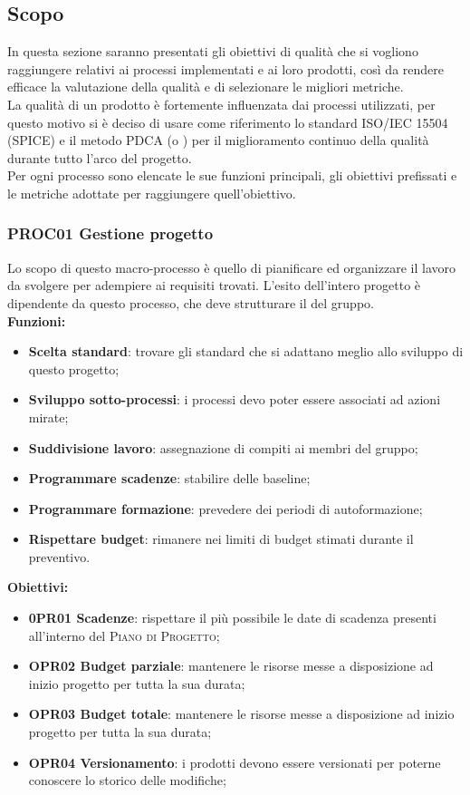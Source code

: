 \documentclass[../piano_di_qualifica.tex]{subfiles}
\begin{document}
\subsection{Scopo}
In questa sezione saranno presentati gli obiettivi di qualità che si vogliono raggiungere relativi ai processi implementati e ai loro prodotti, così da rendere efficace la valutazione della qualità e di selezionare le migliori metriche.\\
La qualità di un prodotto è fortemente influenzata dai processi utilizzati, per questo motivo si è deciso di usare come riferimento lo standard ISO/IEC 15504 (SPICE)  e il metodo PDCA (o ) per il miglioramento continuo della qualità durante tutto l'arco del progetto.\\
Per ogni processo sono elencate le sue funzioni principali, gli obiettivi prefissati e le metriche adottate per raggiungere quell’obiettivo.

\subsubsection{PROC01 Gestione progetto}
Lo scopo di questo macro-processo è quello di pianificare ed organizzare il lavoro da svolgere per adempiere ai requisiti trovati. L'esito dell'intero progetto è dipendente da questo processo, che deve strutturare il  del gruppo.\\

\setlength{\parindent}{0pt}\textbf{Funzioni:}
\smallbreak
\begin{itemize}
	\item \textbf{Scelta standard}: trovare gli standard che si adattano meglio allo sviluppo di questo progetto;
	\item \textbf{Sviluppo sotto-processi}: i processi devo poter essere associati ad azioni mirate;
	\item \textbf{Suddivisione lavoro}: assegnazione di compiti ai membri del gruppo;
	\item \textbf{Programmare scadenze}: stabilire delle baseline;
	\item \textbf{Programmare formazione}: prevedere dei periodi di autoformazione;
	\item \textbf{Rispettare budget}: rimanere nei limiti di budget stimati durante il preventivo.
\end{itemize}

\textbf{Obiettivi:}
\smallbreak
\begin{itemize}
	\item \textbf{0PR01 Scadenze}: rispettare il più possibile le date di scadenza presenti all'interno del \textsc{Piano di Progetto};
	\item \textbf{OPR02 Budget parziale}: mantenere le risorse messe a disposizione ad inizio progetto per tutta la sua durata;
	\item \textbf{OPR03 Budget totale}: mantenere le risorse messe a disposizione ad inizio progetto per tutta la sua durata; 
	\item \textbf{OPR04 Versionamento}: i prodotti devono essere versionati per poterne conoscere lo storico delle modifiche;
\end{itemize}
\end{document}
